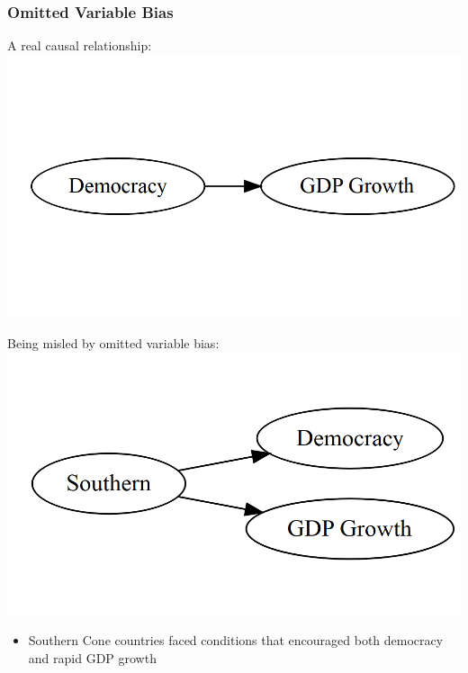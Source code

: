 \documentclass[xcolor=x11names,compress]{beamer}\usepackage[]{graphicx}\usepackage[]{xcolor}
\makeatletter
\def\maxwidth{ %
  \ifdim\Gin@nat@width>\linewidth
    \linewidth
  \else
    \Gin@nat@width
  \fi
}
\newenvironment{knitrout}{}{} %
\renewcommand{\(}{\begin{columns}}
\renewcommand{\)}{\end{columns}}
\newcommand{\<}[1]{\begin{column}{#1}}
\renewcommand{\>}{\end{column}}
\makeatother
\begin{document}
\begin{frame}
\frametitle{Omitted Variable Bias}
\begin{multicols}{2}
A real causal relationship:
\begin{knitrout}
\color{fgcolor}
\includegraphics[width=\maxwidth]{figure/explanation9-1} 
\end{knitrout}
\columnbreak

Being misled by omitted variable bias:
\begin{knitrout}
\color{fgcolor}
\includegraphics[width=\maxwidth]{figure/explanation10-1} 
\end{knitrout}
\end{multicols}
\begin{itemize}
\pause
\item Southern Cone countries faced conditions that encouraged both democracy and rapid GDP growth
\end{itemize}
\end{frame}
\end{document}
